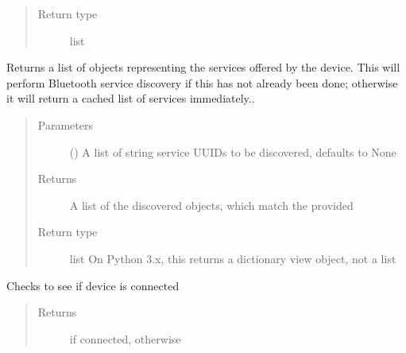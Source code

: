\documentclass[letterpaper,10pt,english]{sphinxmanual}
\begin{document}
\begin{fulllineitems}
\begin{fulllineitems}
\begin{quote}
\begin{description}
\item[{Return type}] \leavevmode
list

\end{description}\end{quote}

\end{fulllineitems}


\begin{fulllineitems}
\label{\detokenize{simpleble:simpleble.SimpleBleDevice.getServices}}
Returns a list of  objects representing the services offered by the device. This will perform Bluetooth service discovery if this has not already been done; otherwise it will return a cached list of services immediately..
\begin{quote}\begin{description}
\item[{Parameters}] \leavevmode
{} (\sphinxstyleliteralemphasis{\sphinxupquote{, }}) \textendash{} A list of string service UUIDs to be discovered, defaults to None

\item[{Returns}] \leavevmode
A list of the discovered  objects, which match the provided 

\item[{Return type}] \leavevmode
list On Python 3.x, this returns a dictionary view object, not a list

\end{description}\end{quote}

\end{fulllineitems}


\begin{fulllineitems}
\label{\detokenize{simpleble:simpleble.SimpleBleDevice.isConnected}}
Checks to see if device is connected
\begin{quote}\begin{description}
\item[{Returns}] \leavevmode
{} if connected,  otherwise


\end{description}
\end{quote}
\end{fulllineitems}
\end{fulllineitems}
\end{document}
